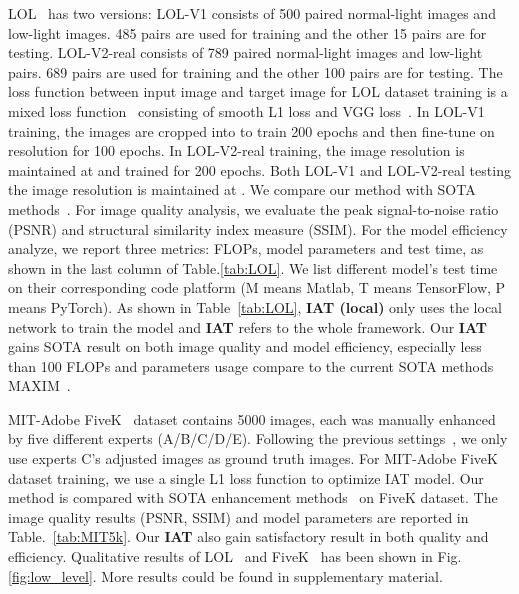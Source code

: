 \documentclass{bmvc2k}
\begin{document}
LOL~\cite{LOL_dataset} has two versions: LOL-V1 consists of 500 paired normal-light images and low-light images. 485 pairs are used for training and the other 15 pairs are for testing.
LOL-V2-real consists of 789 paired normal-light images and low-light pairs. 689 pairs are used for training and the other 100 pairs are for testing. The loss function between input image  and target image  for LOL dataset training is a mixed loss function~\cite{TransWeather}  consisting of smooth L1 loss and VGG loss~\cite{Perceptual_loss}. In LOL-V1 training, the images are cropped into  to train 200 epochs and then fine-tune on  resolution for 100 epochs. In LOL-V2-real training, the image resolution is maintained at  and trained for 200 epochs. Both LOL-V1 and LOL-V2-real testing the image resolution is maintained at . We compare our method with SOTA methods~\cite{LIME,LOL_dataset,Lv2018MBLLEN,KIND,zero_dce,DRBN_CVPR,RCT_ICCV21,IPT_CVPR,3DLUT,Wang2022Uformer,MLP_enhancement}. For image quality analysis, we evaluate the peak signal-to-noise ratio (PSNR) and structural
similarity index measure (SSIM). For the model efficiency analyze, we report three metrics: FLOPs, model parameters and test time, as shown in the last column of Table.\ref{tab:LOL}. We list different model's test time on their corresponding code platform (M means Matlab, T means TensorFlow, P means PyTorch). As shown in Table~\ref{tab:LOL}, \textbf{IAT (local)} only uses the local network to train the model and \textbf{IAT} refers to the whole framework. Our \textbf{IAT} gains SOTA result on both image quality and model efficiency, especially less than 100 FLOPs and parameters usage compare to the current SOTA methods MAXIM~\cite{MLP_enhancement}.





MIT-Adobe FiveK~\cite{fivek_dataset} dataset contains 5000 images, each  was manually enhanced by five different experts (A/B/C/D/E). Following the previous settings~\cite{DeepUPE_2019_CVPR,Deep_LPF}, we only use experts C's adjusted images as ground truth images. For MIT-Adobe FiveK~\cite{fivek_dataset} dataset training, we use a single L1 loss function to optimize IAT model. Our method is compared with SOTA enhancement methods~\cite{white_box,unet,DPE_CVPR18,DPED,DeepUPE_2019_CVPR,DeepUPE_2019_CVPR,Deep_LPF,3DLUT} on FiveK dataset. The image quality results (PSNR, SSIM) and model parameters are reported in Table.~\ref{tab:MIT5k}. Our \textbf{IAT} also gain satisfactory result in both quality and efficiency. Qualitative results of LOL~\cite{LOL_dataset} and FiveK~\cite{fivek_dataset} has been shown in Fig.\ref{fig:low_level}. More results could be found in supplementary material.  
\end{document}
